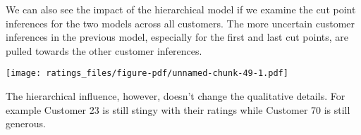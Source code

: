 \documentclass[
  letterpaper,
  DIV=11,
  numbers=noendperiod]{scrartcl}
\newenvironment{Shaded}{\begin{snugshade}}{\end{snugshade}}
\newcommand{\AttributeTok}[1]{\textcolor[rgb]{0.40,0.45,0.13}{#1}}
\newcommand{\ControlFlowTok}[1]{\textcolor[rgb]{0.00,0.23,0.31}{#1}}
\newcommand{\DecValTok}[1]{\textcolor[rgb]{0.68,0.00,0.00}{#1}}
\newcommand{\FunctionTok}[1]{\textcolor[rgb]{0.28,0.35,0.67}{#1}}
\newcommand{\NormalTok}[1]{\textcolor[rgb]{0.00,0.23,0.31}{#1}}
\newcommand{\OtherTok}[1]{\textcolor[rgb]{0.00,0.23,0.31}{#1}}
\newcommand{\SpecialCharTok}[1]{\textcolor[rgb]{0.37,0.37,0.37}{#1}}
\newcommand{\StringTok}[1]{\textcolor[rgb]{0.13,0.47,0.30}{#1}}
\begin{document}
We can also see the impact of the hierarchical model if we examine the
cut point inferences for the two models across all customers. The more
uncertain customer inferences in the previous model, especially for the
first and last cut points, are pulled towards the other customer
inferences.

\begin{Shaded}
\end{Shaded}

\texttt{[image: ratings\_files/figure-pdf/unnamed-chunk-49-1.pdf]}

The hierarchical influence, however, doesn't change the qualitative
details. For example Customer 23 is still stingy with their ratings
while Customer 70 is still generous.
\end{document}

